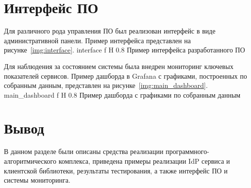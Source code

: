 \section{Интерфейс ПО}
Для различного рода управления ПО был реализован интерфейс в виде административной панели. Пример интерфейса представлен на рисунке~\ref{img:interface}.
    {interface}
    {f}
    {H}
    {0.8\textwidth}
    {Пример интерфейса разработанного ПО}
    
Для наблюдения за состоянием системы была внедрен мониторинг ключевых показателей сервисов. Пример дашборда в Grafana с графиками, построенных по собранным данным, представлен на рисунке~\ref{img:main_dashboard}.
    {main_dashboard}
    {f}
    {H}
    {0.8\textwidth}
    {Пример дашборда с графиками по собранным данным}

\section*{Вывод}
В данном разделе были описаны средства реализации программного-алгоритмического комплекса, приведена примеры реализации IdP сервиса и клиентской библиотеки, результаты тестирования, а также интерфейс ПО и системы мониторинга.

%	
%
%
